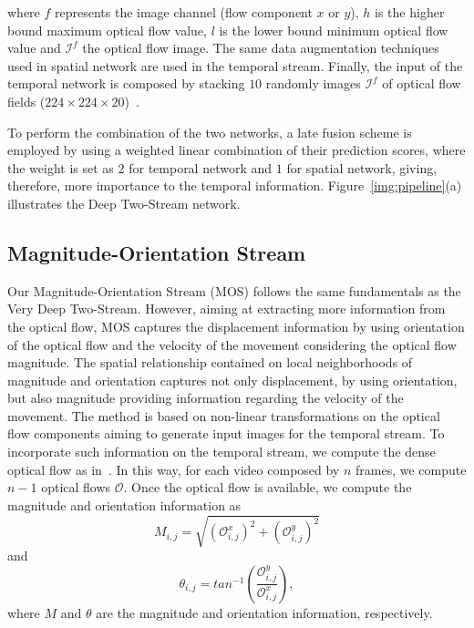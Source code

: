 \documentclass[10pt,conference]{IEEEtran}
\begin{document}
\noindent where $f$ represents the image channel (flow component $x$ or $y$), $h$ is the higher bound maximum optical flow value, $l$ is the lower bound minimum optical flow value and $\mathcal I^{f}$ the optical flow image. The same data augmentation techniques used in spatial network are used in the temporal stream. Finally, the input of the temporal network is composed by stacking $10$ randomly images $\mathcal I^{f}$ of optical flow fields ($224\times224\times20$)~\cite{Simonyan:2014}. 

To perform the combination of the two networks, a late fusion scheme is employed by using a weighted linear combination of their prediction scores, where the weight is set as $2$ for temporal network and $1$ for spatial network, giving, therefore, more importance to the temporal information. Figure~\ref{img:pipeline}(a) illustrates the Deep Two-Stream network.


\subsection{Magnitude-Orientation Stream}

Our Magnitude-Orientation Stream (MOS) follows the same fundamentals as the Very Deep Two-Stream. However, aiming at extracting more information from the optical flow, MOS captures the displacement information by using orientation of the optical flow and the velocity of the movement considering the optical flow magnitude. The spatial relationship contained on local neighborhoods of magnitude and orientation captures not only displacement, by using orientation, but also magnitude providing information regarding the velocity of the movement. The method is based on non-linear transformations on the optical flow components aiming to generate input images for the temporal stream. 
To incorporate such information on the temporal stream, we compute the dense optical flow as in~\cite{Wang:2015}. In this way, for each video composed by $n$ frames, we compute $n-1$ optical flows $\mathcal O$. Once the optical flow is available, we compute the magnitude and orientation information as
\begin{equation}\label{eq:mag}
	M_{i,j} = \sqrt{ (\mathcal O^{x}_{i,j})^{2} + (\mathcal O^{y}_{i,j})^{2}}
\end{equation}
and
\begin{equation}\label{eq:ori}
	\theta_{i,j} = tan^{-1} \left( \frac{\mathcal O^{y}_{i,j}}{\mathcal O^{x}_{i,j}} \right),
\end{equation}
\noindent where $M$ and $\theta$ are the magnitude and orientation information, respectively.
\end{document}
